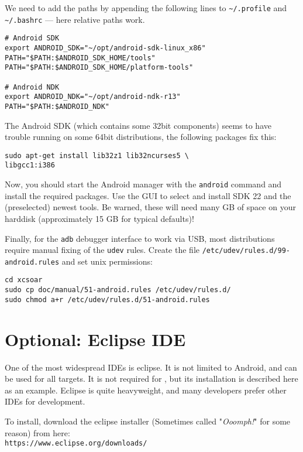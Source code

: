 We need to add the paths by appending the following lines to \texttt{\textasciitilde/.profile} and \texttt{\textasciitilde/.bashrc} --- here relative paths work.

\begin{verbatim}
# Android SDK
export ANDROID_SDK="~/opt/android-sdk-linux_x86"
PATH="$PATH:$ANDROID_SDK_HOME/tools"
PATH="$PATH:$ANDROID_SDK_HOME/platform-tools"

# Android NDK
export ANDROID_NDK="~/opt/android-ndk-r13"
PATH="$PATH:$ANDROID_NDK"
\end{verbatim}

The Android SDK (which contains some 32bit components) seems to have trouble running on some 64bit distributions, the following packages fix this:

\begin{verbatim}
sudo apt-get install lib32z1 lib32ncurses5 \
libgcc1:i386
\end{verbatim}

Now, you should start the Android manager with the \texttt{android} command and install the required packages.
Use the GUI to select and install SDK 22 and the (preselected) newest tools.
Be warned, these will need many GB of space on your harddisk (approximately 15 GB for typical defaults)!

Finally, for the \texttt{adb} debugger interface to work via USB, most distributions require manual fixing of the \texttt{udev} rules.
Create the file \texttt{/etc/udev/rules.d/99-android.rules} and set unix permissions:

\begin{verbatim}
cd xcsoar
sudo cp doc/manual/51-android.rules /etc/udev/rules.d/
sudo chmod a+r /etc/udev/rules.d/51-android.rules
\end{verbatim}

\section{Optional: Eclipse IDE}
One of the most widespread IDEs is eclipse. It is not limited to Android, and can be used for all targets. It is not required for \xc, but its installation is described here as an example. Eclipse is quite heavyweight, and many developers prefer other IDEs for \xc development.

To install, download the eclipse installer (Sometimes called "\emph{Ooomph!}" for some reason) from here:\\
\texttt{https://www.eclipse.org/downloads/}

